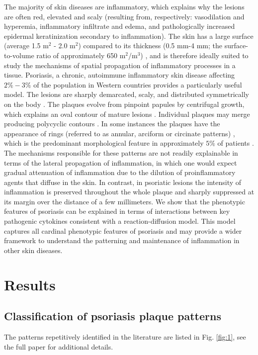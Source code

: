 The majority of skin diseases are inflammatory, which explains why the lesions are often red, elevated and scaly (resulting from, respectively: vasodilation and hyperemia, inflammatory infiltrate and edema, and pathologically increased epidermal keratinization secondary to inflammation). The skin has a large surface (average 1.5 m$^2$ - 2.0 m$^2$) compared to its thickness (0.5 mm-4 mm; the surface-to-volume ratio of approximately 650 m$^2$/m$^3$) \citep{leider1949}, and is therefore ideally suited to study the mechanisms of spatial propagation of inflammatory processes in a tissue. Psoriasis, a chronic, autoimmune inflammatory skin disease affecting $2\%-3\%$ of the population in Western countries \citep{parisi2013} provides a particularly useful model. The lesions are sharply demarcated, scaly, and distributed symmetrically on the body \citep{christophers2001, griffiths2007, nestle2009}. The plaques evolve from pinpoint papules by centrifugal growth, which explains an oval contour of mature lesions \citep{farber1985, soltani1972}. Individual plaques may merge producing polycyclic contours \citep{christophers2001, farber1985}. In some instances the plaques have the appearance of rings (referred to as annular, arciform or circinate patterns) \citep{christophers2001, nast2016}, which is the predominant morphological feature in approximately $5\%$ of patients \citep{morris2001}. The mechanisms responsible for these patterns are not readily explainable in terms of the lateral propagation of inflammation, in which one would expect gradual attenuation of inflammation due to the dilution of proinflammatory agents that diffuse in the skin. In contrast, in psoriatic lesions the intensity of inflammation is preserved throughout the whole plaque and sharply suppressed at its margin over the distance of a few millimeters. We show that the phenotypic features of psoriasis can be explained in terms of interactions between key pathogenic cytokines consistent with a reaction-diffusion model. This model captures all cardinal phenotypic features of psoriasis and may provide a wider framework to understand the patterning and maintenance of inflammation in other skin diseases. 

\section{Results}
\subsection{Classification of psoriasis plaque patterns}
The patterns repetitively identified in the literature are listed in Fig. \ref{fig:1}, see the full paper for additional details.

